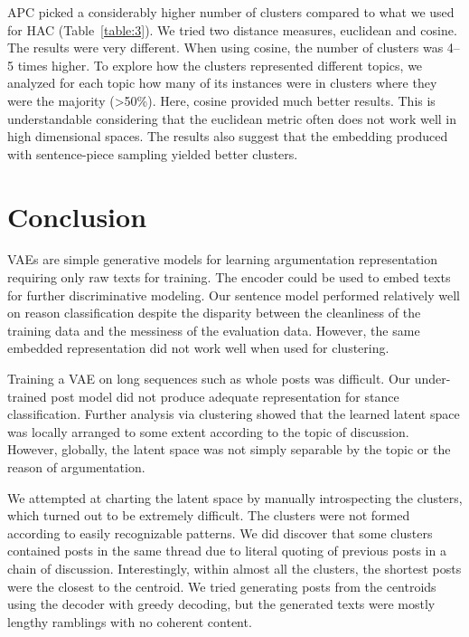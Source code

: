 \documentclass[11pt]{article}
\begin{document}
APC picked a considerably higher number of clusters compared to what we used for HAC (Table~\ref{table:3}).
We tried two distance measures, euclidean and cosine.
The results were very different.
When using cosine, the number of clusters was 4--5 times higher.
To explore how the clusters represented different topics,
we analyzed for each topic how many of its instances were in clusters where they were the majority (>50\%).
Here, cosine provided much better results.
This is understandable considering that the euclidean metric often does not work well in high dimensional spaces.
The results also suggest that the embedding produced with sentence-piece sampling yielded better clusters.

\section{Conclusion}\label{sec:conclusion}

VAEs are simple generative models for learning argumentation representation requiring only raw texts for training.
The encoder could be used to embed texts for further discriminative modeling.
Our sentence model performed relatively well on reason classification
despite the disparity between the cleanliness of the training data and the messiness of the evaluation data.
However, the same embedded representation did not work well when used for clustering.

Training a VAE on long sequences such as whole posts was difficult.
Our under-trained post model did not produce adequate representation for stance classification.
Further analysis via clustering showed that the learned latent space
was locally arranged to some extent according to the topic of discussion.
However, globally, the latent space was not simply separable by the topic or the reason of argumentation.

We attempted at charting the latent space by manually introspecting the clusters,
which turned out to be extremely difficult.
The clusters were not formed according to easily recognizable patterns.
We did discover that some clusters contained posts in the same thread
due to literal quoting of previous posts in a chain of discussion.
Interestingly, within almost all the clusters,
the shortest posts were the closest to the centroid.
We tried generating posts from the centroids using the decoder with greedy decoding,
but the generated texts were mostly lengthy ramblings with no coherent content.
\end{document}
